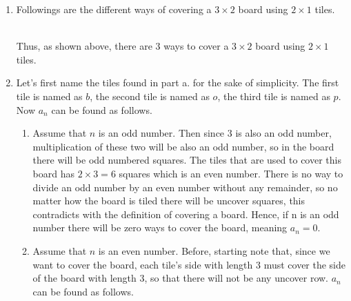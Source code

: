 \documentclass[12pt]{article}
\begin{document}
\renewcommand{\theenumi}{\alph{enumi}}
\renewcommand{\theenumii}{\roman{enumii}}
\begin{enumerate}
    \item Followings are the different ways of covering a $3 \times 2$ board using $2 \times 1$ tiles. \\
    \\


Thus, as shown above, there are $3$ ways to cover a $3 \times 2$ board using $2 \times 1$ tiles.

    \item Let's first name the tiles found in part a. for the sake of simplicity. The first tile is named as $b$, the second tile is named as $o$, the third tile is named as $p$. Now $a_n$ can be found as follows.
    
    \begin{enumerate}
        \item Assume that $n$ is an odd number. Then since $3$ is also an odd number, multiplication of these two will be also an odd number, so in the board there will be odd numbered squares. The tiles that are used to cover this board has $2 \times 3 = 6$ squares which is an even number. There is no way to divide an odd number by an even number without any remainder, so no matter how the board is tiled there will be uncover squares, this contradicts with the definition of covering a board. Hence, if n is an odd number there will be zero ways to cover the board, meaning $a_n = 0$.
        
        \item Assume that $n$ is an even number. Before, starting note that, since we want to cover the board, each tile's side with length $3$ must cover the side of the board with length $3$, so that there will not be any uncover row. $a_n$ can be found as follows.
        

\end{enumerate}
\end{enumerate}
\end{document}

